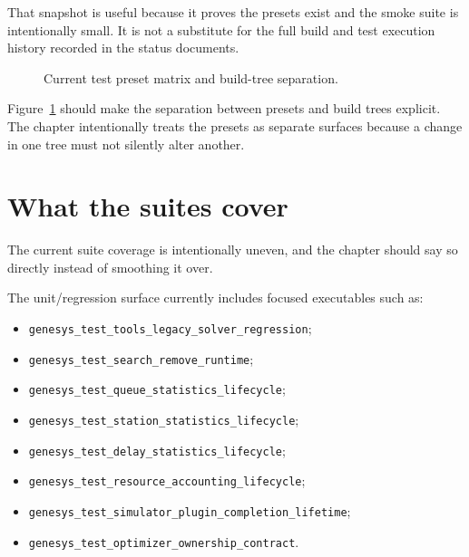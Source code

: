 That snapshot is useful because it proves the presets exist and the smoke
suite is intentionally small. It is not a substitute for the full build and
test execution history recorded in the status documents.

\begin{figure}[htbp]
\centering
\caption{Current test preset matrix and build-tree separation.}
\label{fig:validation-preset-matrix}
\end{figure}

Figure~\ref{fig:validation-preset-matrix} should make the separation between
presets and build trees explicit. The chapter intentionally treats the
presets as separate surfaces because a change in one tree must not silently
alter another.

\section{What the suites cover}
\label{sec:test-suite-coverage}

The current suite coverage is intentionally uneven, and the chapter should say
so directly instead of smoothing it over.

The unit/regression surface currently includes focused executables such as:
\begin{itemize}
\item \texttt{genesys\_test\_tools\_legacy\_solver\_regression};
\item \texttt{genesys\_test\_search\_remove\_runtime};
\item \texttt{genesys\_test\_queue\_statistics\_lifecycle};
\item \texttt{genesys\_test\_station\_statistics\_lifecycle};
\item \texttt{genesys\_test\_delay\_statistics\_lifecycle};
\item \texttt{genesys\_test\_resource\_accounting\_lifecycle};
\item \texttt{genesys\_test\_simulator\_plugin\_completion\_lifetime};
\item \texttt{genesys\_test\_optimizer\_ownership\_contract}.
\end{itemize}

